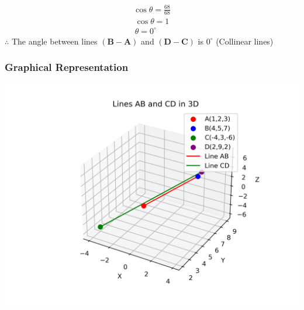 \documentclass{beamer}
\theoremstyle{remark}
\let\vec\mathbf
\numberwithin{equation}{section}
\begin{document}
\begin{align}
    \cos{\theta}=\frac{68}{68}
\end{align}
\begin{align}
    \cos{\theta}=1\\
    \theta=0^\circ
\end{align}
$\therefore$ The angle between lines $\vec{(B-A)}$ and $\vec{(D-C)}$ is $0^\circ$ (Collinear lines)
 \frametitle{Graphical Representation}
 \centering
 \includegraphics[width=0.6\linewidth]{figs/fig1.png}
\end{document}
